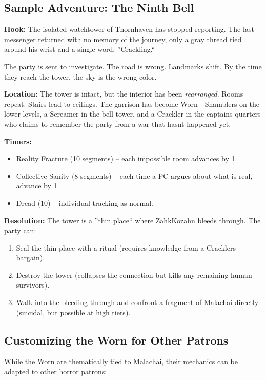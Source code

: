 \documentclass[11pt]{article}
\begin{document}
\subsection{Sample Adventure: The Ninth Bell}

\textbf{Hook:} The isolated watchtower of Thornhaven has stopped reporting. The last messenger returned with no memory of the journey, only a gray thread tied around his wrist and a single word: ''Crackling.``

The party is sent to investigate. The road is wrong. Landmarks shift. By the time they reach the tower, the sky is the wrong color.

\textbf{Location:} The tower is intact, but the interior has been \emph{rearranged}. Rooms repeat. Stairs lead to ceilings. The garrison has become Worn---Shamblers on the lower levels, a Screamer in the bell tower, and a Crackler in the captain\textquotesingle s quarters who claims to remember the party from a war that hasn\textquotesingle t happened yet.

\textbf{Timers:}
\begin{itemize}
\item Reality Fracture (10 segments) -- each impossible room advances by 1.
\item Collective Sanity (8 segments) -- each time a PC argues about what is real, advance by 1.
\item Dread (10) -- individual tracking as normal.
\end{itemize}

\textbf{Resolution:} The tower is a ''thin place`` where Zahk\textquotesingle Kozahn bleeds through. The party can:
\begin{enumerate}
\item Seal the thin place with a ritual (requires knowledge from a Crackler\textquotesingle s bargain).
\item Destroy the tower (collapses the connection but kills any remaining human survivors).
\item Walk into the bleeding-through and confront a fragment of Malachai directly (suicidal, but possible at high tiers).
\end{enumerate}

\subsection{Customizing the Worn for Other Patrons}

While the Worn are thematically tied to Malachai, their mechanics can be adapted to other horror patrons:
\end{document}
